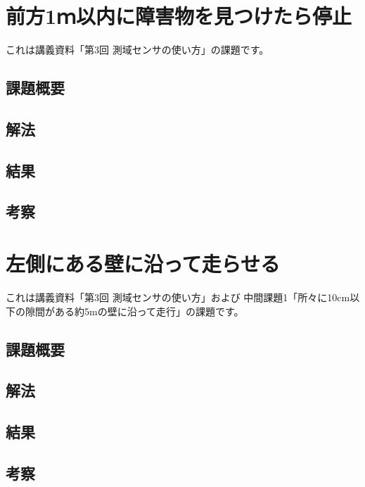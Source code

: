 \documentclass[main]{subfiles}
\begin{document}
\chapter{前方1ｍ以内に障害物を見つけたら停止}

これは講義資料「第3回 測域センサの使い方」の課題です。

\section{課題概要}
\section{解法}
\section{結果}
\section{考察}

\chapter{左側にある壁に沿って走らせる}

これは講義資料「第3回 測域センサの使い方」および
中間課題1「所々に10cm以下の隙間がある約5mの壁に沿って走行」の課題です。

\section{課題概要}
\section{解法}
\section{結果}
\section{考察}
\end{document}
